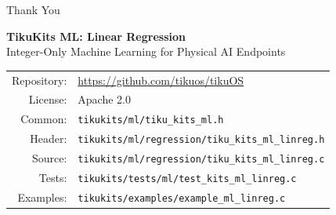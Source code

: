 \documentclass[aspectratio=169, 10pt]{beamer}
\begin{document}
\begin{frame}{Thank You}
\begin{center}
\Large\textbf{TikuKits ML: Linear Regression}\\[0.5em]
\normalsize Integer-Only Machine Learning for Physical AI Endpoints\\[1.5em]

\begin{tabular}{rl}
  Repository: & \url{https://github.com/tikuos/tikuOS} \\
  License:    & Apache 2.0 \\
  Common:     & \texttt{tikukits/ml/tiku\_kits\_ml.h} \\
  Header:     & \texttt{tikukits/ml/regression/tiku\_kits\_ml\_linreg.h} \\
  Source:     & \texttt{tikukits/ml/regression/tiku\_kits\_ml\_linreg.c} \\
  Tests:      & \texttt{tikukits/tests/ml/test\_kits\_ml\_linreg.c} \\
  Examples:   & \texttt{tikukits/examples/example\_ml\_linreg.c} \\
\end{tabular}
\end{center}
\end{frame}
\end{document}
